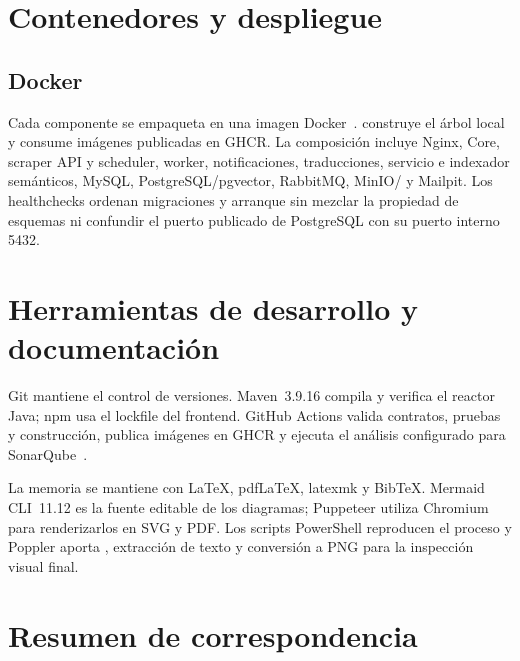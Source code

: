 \section{Contenedores y despliegue}

\subsection{Docker}

Cada componente se empaqueta en una imagen Docker~\cite{docker}.  construye el árbol local y  consume imágenes publicadas en GHCR. La composición incluye Nginx, Core, scraper API y scheduler, worker, notificaciones, traducciones, servicio e indexador semánticos, MySQL, PostgreSQL/pgvector, RabbitMQ, MinIO/ y Mailpit. Los healthchecks ordenan migraciones y arranque sin mezclar la propiedad de esquemas ni confundir el puerto publicado de PostgreSQL con su puerto interno 5432.

\section{Herramientas de desarrollo y documentación}

Git mantiene el control de versiones. Maven~3.9.16 compila y verifica el reactor Java; npm usa el lockfile del frontend. GitHub Actions valida contratos, pruebas y construcción, publica imágenes en GHCR y ejecuta el análisis configurado para SonarQube~\cite{sonarqube}.

La memoria se mantiene con \LaTeX{}, pdf\LaTeX{}, latexmk y BibTeX. Mermaid CLI~11.12 es la fuente editable de los diagramas; Puppeteer utiliza Chromium para renderizarlos en SVG y PDF. Los scripts PowerShell reproducen el proceso y Poppler aporta , extracción de texto y conversión a PNG para la inspección visual final.

\section{Resumen de correspondencia}

